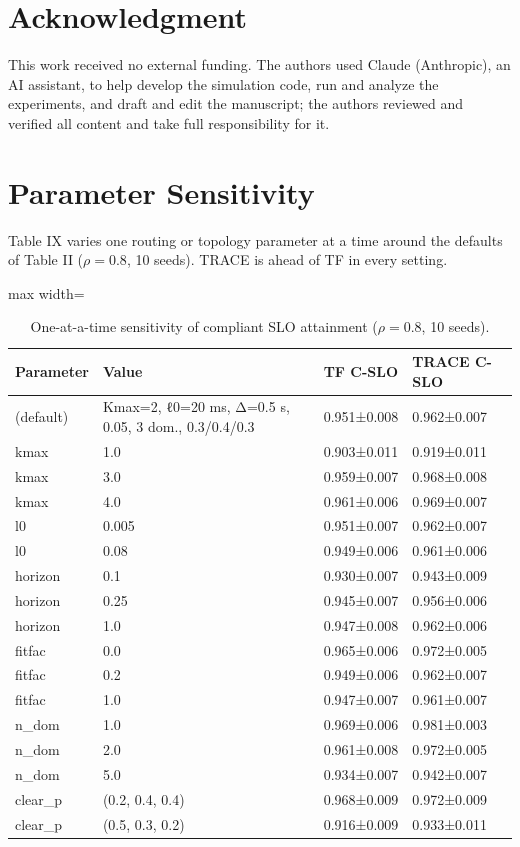 \documentclass[journal]{IEEEtran}
\begin{document}
\section*{Acknowledgment}

This work received no external funding. The authors used Claude (Anthropic), an AI assistant, to help develop the simulation code, run and analyze the experiments, and draft and edit the manuscript; the authors reviewed and verified all content and take full responsibility for it.




\appendices

\section{Parameter Sensitivity}

Table IX varies one routing or topology parameter at a time around the defaults of Table II (\(\rho=0.8\), 10 seeds). TRACE is ahead of TF in every setting.

\begin{table}[!t]
\centering
\caption{One-at-a-time sensitivity of compliant SLO attainment (\(\rho=0.8\), 10 seeds).}
\footnotesize
\begin{adjustbox}{max width=\columnwidth}
\begin{tabular}{llll}
\toprule
Parameter & Value & TF C-SLO & TRACE C-SLO \\
\midrule
(default) & Kmax=2, ℓ0=20 ms, Δ=0.5 s, 0.05, 3 dom., 0.3/0.4/0.3 & 0.951±0.008 & 0.962±0.007 \\
kmax & 1.0 & 0.903±0.011 & 0.919±0.011 \\
kmax & 3.0 & 0.959±0.007 & 0.968±0.008 \\
kmax & 4.0 & 0.961±0.006 & 0.969±0.007 \\
l0 & 0.005 & 0.951±0.007 & 0.962±0.007 \\
l0 & 0.08 & 0.949±0.006 & 0.961±0.006 \\
horizon & 0.1 & 0.930±0.007 & 0.943±0.009 \\
horizon & 0.25 & 0.945±0.007 & 0.956±0.006 \\
horizon & 1.0 & 0.947±0.008 & 0.962±0.006 \\
fitfac & 0.0 & 0.965±0.006 & 0.972±0.005 \\
fitfac & 0.2 & 0.949±0.006 & 0.962±0.007 \\
fitfac & 1.0 & 0.947±0.007 & 0.961±0.007 \\
n\_dom & 1.0 & 0.969±0.006 & 0.981±0.003 \\
n\_dom & 2.0 & 0.961±0.008 & 0.972±0.005 \\
n\_dom & 5.0 & 0.934±0.007 & 0.942±0.007 \\
clear\_p & (0.2, 0.4, 0.4) & 0.968±0.009 & 0.972±0.009 \\
clear\_p & (0.5, 0.3, 0.2) & 0.916±0.009 & 0.933±0.011 \\
\bottomrule
\end{tabular}
\end{adjustbox}
\end{table}
\end{document}
